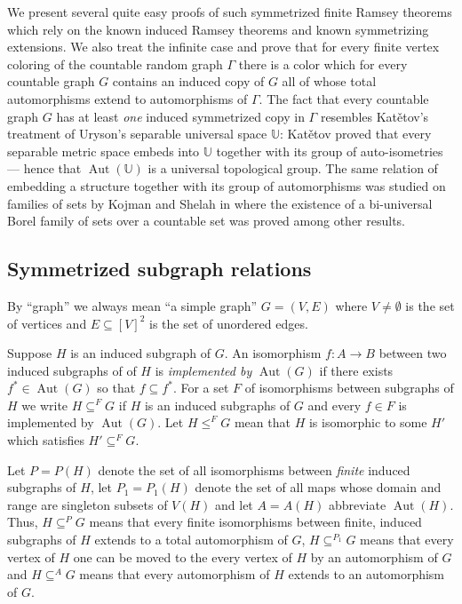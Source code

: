 \documentclass[11pt]{amsart}
\newcommand{\su}{\subseteq}
\newcommand{\aut}{\operatorname{Aut}}
\newcommand{\U}{\mathbb{U}}
\begin{document}
We present several quite easy proofs of such symmetrized finite Ramsey
theorems which rely on the known induced Ramsey theorems and known
symmetrizing extensions. We also treat the infinite case and prove
that
for every finite vertex coloring of the countable random graph
$\Gamma$
there is a color which for  every countable graph $G$ contains an
induced copy of $G$ all of whose total automorphisms extend to
automorphisms of $\Gamma$. The fact that every countable graph $G$ has
at
least \emph{one} induced symmetrized copy in $\Gamma$ resembles
Kat\v etov's
treatment \cite{K} of Uryson's separable universal space $\U$: Kat\v
etov
proved that
every separable metric space embeds into $\U$ together with its group
of
auto-isometries --- hence that $\aut(\U)$ is a universal topological
group. The same relation of embedding a structure together with its
group of automorphisms was studied on families of sets by Kojman
and
Shelah in \cite{KS} where the existence of a bi-universal Borel family
of
sets over a countable set was proved among other results.

\subsection{Symmetrized subgraph relations}

By ``graph'' we always  mean  ``a simple graph'' $G=(V,E)$ where
$V\not=\emptyset$ is the set of vertices and $E\su [V]^2$ is the set
of
unordered edges.

 Suppose $H$ is an induced subgraph of
$G$. An isomorphism $f:A\to
B$ between two induced subgraphs of of $H$ is \emph{implemented by}
$\aut(G)$
if there exists $f^*\in \aut (G)$ so that $f\su f^*$. For a set $F$ of
isomorphisms between subgraphs of $H$ we write $H\su ^{F} G$ if $H$ is
an induced subgraphs of $G$ and every $f\in F$ is implemented by $\aut
(G)$. Let $H\le ^F G$ mean that $H$
is isomorphic to some $H'$ which satisfies $H'\su ^F G$.


Let $P=P(H)$ denote the set of all isomorphisms between \emph{finite}
induced subgraphs of $H$, let $P_1=P_1(H)$ denote the set of all maps
whose domain and range are singleton subsets of $V(H)$ and let
$A=A(H)$ abbreviate $\aut (H)$. Thus, $H\su ^P G$ means that every
finite isomorphisms between finite, induced subgraphs of $H$ extends
to a total automorphism of $G$, $H\su^{P_1} G$ means that every vertex
of $H$ one can be moved to the every vertex of $H$ by an automorphism
of $G$ and $H\su ^A G$ means that every automorphism of $H$ extends to
an automorphism of $G$.
\end{document}
